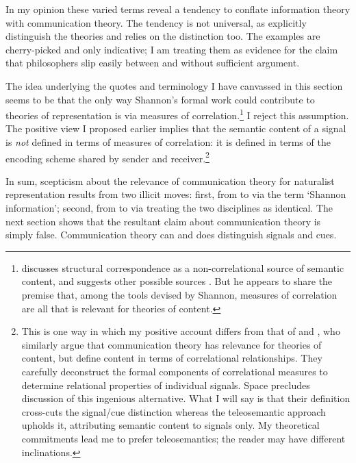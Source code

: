 \documentclass[12pt]{article}
\begin{document}
\noindent In my opinion these varied terms reveal a tendency to conflate information theory with communication theory.
The tendency is not universal, as \citet[17-20]{piccinini2011information} explicitly distinguish the theories and \citet{rathkopf2017neural} relies on the distinction too.
The examples are cherry-picked and only indicative; I am treating them as evidence for the claim that philosophers slip easily between \ait{} and \act{} without sufficient argument.

The idea underlying the quotes and terminology I have canvassed in this section seems to be that the only way Shannon's formal work could contribute to theories of representation is via measures of correlation.\footnote{\citet[$\S$5]{shea2018representation} discusses structural correspondence as a non-correlational source of semantic content, and suggests other possible sources \citep[p. 76 n. 1]{shea2018representation}. But he appears to share the premise that, among the tools devised by Shannon, measures of correlation are all that is relevant for theories of content.}
I reject this assumption.
The positive view I proposed earlier implies that the semantic content of a signal is \textit{not} defined in terms of measures of correlation: it is defined in terms of the encoding scheme shared by sender and receiver.\footnote{This is one way in which my positive account differs from that of \citet{isaac2018semantics} and \citet[$\S$3]{skyrms2010signals}, who similarly argue that communication theory has relevance for theories of content, but define content in terms of correlational relationships. They carefully deconstruct the formal components of correlational measures to determine relational properties of individual signals. Space precludes discussion of this ingenious alternative. What I will say is that their definition cross-cuts the signal/cue distinction whereas the teleosemantic approach upholds it, attributing semantic content to signals only. My theoretical commitments lead me to prefer teleosemantics; the reader may have different inclinations.}

In sum, scepticism about the relevance of communication theory for naturalist representation results from two illicit moves: first, from \ami{} to \ait{} via the term `Shannon information'; second, from \ait{} to \act{} via treating the two disciplines as identical.
The next section shows that the resultant claim about communication theory is simply false.
Communication theory can and does distinguish signals and cues.


\end{document}
